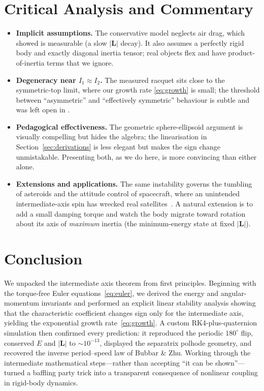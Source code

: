 \documentclass[11pt,letterpaper]{article}
\begin{document}
\section{Critical Analysis and Commentary}
\begin{itemize}
\item \textbf{Implicit assumptions.} The conservative model neglects air drag,
which \cite{bubbar2025} showed is measurable (a slow $|\mathbf{L}|$ decay). It
also assumes a perfectly rigid body and exactly diagonal inertia tensor; real
objects flex and have product-of-inertia terms that we ignore.
\item \textbf{Degeneracy near $I_1 \approx I_2$.} The measured racquet sits
close to the symmetric-top limit, where our growth rate \eqref{eq:growth} is
small; the threshold between ``asymmetric'' and ``effectively symmetric''
behaviour is subtle and was left open in \cite{bubbar2025}.
\item \textbf{Pedagogical effectiveness.} The geometric sphere-ellipsoid
argument is visually compelling but hides the algebra; the linearisation in
Section~\ref{sec:derivations} is less elegant but makes the sign change
unmistakable. Presenting both, as we do here, is more convincing than either
alone.
\item \textbf{Extensions and applications.} The same instability governs the
tumbling of asteroids and the attitude control of spacecraft, where an
unintended intermediate-axis spin has wrecked real satellites~\cite{muller2019}.
A natural extension is to add a small damping torque and watch the body migrate
toward rotation about its axis of \emph{maximum} inertia (the minimum-energy
state at fixed $|\mathbf{L}|$).
\end{itemize}

\section{Conclusion}
We unpacked the intermediate axis theorem from first principles. Beginning with
the torque-free Euler equations~\eqref{eq:euler}, we derived the energy and
angular-momentum invariants and performed an explicit linear stability analysis
showing that the characteristic coefficient changes sign only for the
intermediate axis, yielding the exponential growth rate~\eqref{eq:growth}. A
custom RK4-plus-quaternion simulation then confirmed every prediction: it
reproduced the periodic $180^\circ$ flip, conserved $E$ and $|\mathbf{L}|$ to
$\sim 10^{-13}$, displayed the separatrix polhode geometry, and recovered the
inverse period--speed law of Bubbar \& Zhu. Working through the intermediate
mathematical steps---rather than accepting ``it can be shown''---turned a
baffling party trick into a transparent consequence of nonlinear coupling in
rigid-body dynamics.
\end{document}
